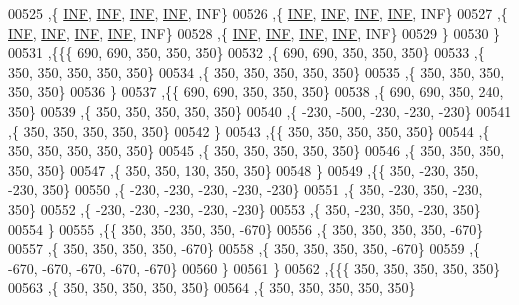 \begin{DoxyCode}
00525    ,\{   \hyperlink{constants_8h_a12c2040f25d8e3a7b9e1c2024c618cb6}{INF},   \hyperlink{constants_8h_a12c2040f25d8e3a7b9e1c2024c618cb6}{INF},   \hyperlink{constants_8h_a12c2040f25d8e3a7b9e1c2024c618cb6}{INF},   \hyperlink{constants_8h_a12c2040f25d8e3a7b9e1c2024c618cb6}{INF},   INF\}
00526    ,\{   \hyperlink{constants_8h_a12c2040f25d8e3a7b9e1c2024c618cb6}{INF},   \hyperlink{constants_8h_a12c2040f25d8e3a7b9e1c2024c618cb6}{INF},   \hyperlink{constants_8h_a12c2040f25d8e3a7b9e1c2024c618cb6}{INF},   \hyperlink{constants_8h_a12c2040f25d8e3a7b9e1c2024c618cb6}{INF},   INF\}
00527    ,\{   \hyperlink{constants_8h_a12c2040f25d8e3a7b9e1c2024c618cb6}{INF},   \hyperlink{constants_8h_a12c2040f25d8e3a7b9e1c2024c618cb6}{INF},   \hyperlink{constants_8h_a12c2040f25d8e3a7b9e1c2024c618cb6}{INF},   \hyperlink{constants_8h_a12c2040f25d8e3a7b9e1c2024c618cb6}{INF},   INF\}
00528    ,\{   \hyperlink{constants_8h_a12c2040f25d8e3a7b9e1c2024c618cb6}{INF},   \hyperlink{constants_8h_a12c2040f25d8e3a7b9e1c2024c618cb6}{INF},   \hyperlink{constants_8h_a12c2040f25d8e3a7b9e1c2024c618cb6}{INF},   \hyperlink{constants_8h_a12c2040f25d8e3a7b9e1c2024c618cb6}{INF},   INF\}
00529    \}
00530   \}
00531  ,\{\{\{   690,   690,   350,   350,   350\}
00532    ,\{   690,   690,   350,   350,   350\}
00533    ,\{   350,   350,   350,   350,   350\}
00534    ,\{   350,   350,   350,   350,   350\}
00535    ,\{   350,   350,   350,   350,   350\}
00536    \}
00537   ,\{\{   690,   690,   350,   350,   350\}
00538    ,\{   690,   690,   350,   240,   350\}
00539    ,\{   350,   350,   350,   350,   350\}
00540    ,\{  -230,  -500,  -230,  -230,  -230\}
00541    ,\{   350,   350,   350,   350,   350\}
00542    \}
00543   ,\{\{   350,   350,   350,   350,   350\}
00544    ,\{   350,   350,   350,   350,   350\}
00545    ,\{   350,   350,   350,   350,   350\}
00546    ,\{   350,   350,   350,   350,   350\}
00547    ,\{   350,   350,   130,   350,   350\}
00548    \}
00549   ,\{\{   350,  -230,   350,  -230,   350\}
00550    ,\{  -230,  -230,  -230,  -230,  -230\}
00551    ,\{   350,  -230,   350,  -230,   350\}
00552    ,\{  -230,  -230,  -230,  -230,  -230\}
00553    ,\{   350,  -230,   350,  -230,   350\}
00554    \}
00555   ,\{\{   350,   350,   350,   350,  -670\}
00556    ,\{   350,   350,   350,   350,  -670\}
00557    ,\{   350,   350,   350,   350,  -670\}
00558    ,\{   350,   350,   350,   350,  -670\}
00559    ,\{  -670,  -670,  -670,  -670,  -670\}
00560    \}
00561   \}
00562  ,\{\{\{   350,   350,   350,   350,   350\}
00563    ,\{   350,   350,   350,   350,   350\}
00564    ,\{   350,   350,   350,   350,   350\}

\end{DoxyCode}
